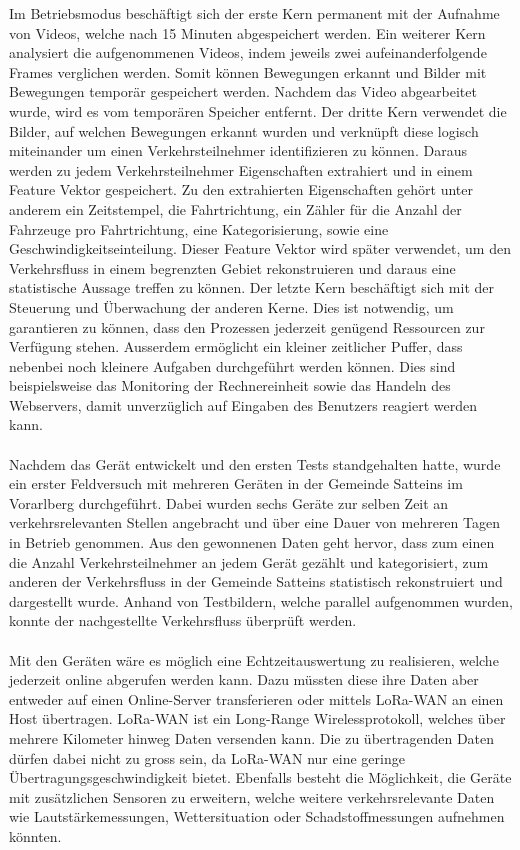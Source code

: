 Im Betriebsmodus beschäftigt sich der erste Kern permanent mit der Aufnahme von Videos, welche nach 15 Minuten abgespeichert werden. Ein weiterer Kern analysiert die aufgenommenen Videos, indem jeweils zwei aufeinanderfolgende Frames verglichen werden. Somit können Bewegungen erkannt und Bilder mit Bewegungen temporär gespeichert werden. Nachdem das Video abgearbeitet wurde, wird es vom temporären Speicher entfernt. Der dritte Kern verwendet die Bilder, auf welchen Bewegungen erkannt wurden und verknüpft diese logisch miteinander um einen Verkehrsteilnehmer identifizieren zu können. Daraus werden zu jedem Verkehrsteilnehmer Eigenschaften extrahiert und in einem Feature Vektor gespeichert. Zu den extrahierten Eigenschaften gehört unter anderem ein Zeitstempel, die Fahrtrichtung, ein Zähler für die Anzahl der Fahrzeuge pro Fahrtrichtung, eine Kategorisierung, sowie eine Geschwindigkeitseinteilung. Dieser Feature Vektor wird später verwendet, um den Verkehrsfluss in einem begrenzten Gebiet rekonstruieren und daraus eine statistische Aussage treffen zu können. Der letzte Kern beschäftigt sich mit der Steuerung und Überwachung der anderen Kerne. Dies ist notwendig, um garantieren zu können, dass den Prozessen jederzeit genügend Ressourcen zur Verfügung stehen. Ausserdem ermöglicht ein kleiner zeitlicher Puffer, dass nebenbei noch kleinere Aufgaben durchgeführt werden können. Dies sind beispielsweise das Monitoring der Rechnereinheit sowie das Handeln des Webservers, damit unverzüglich auf Eingaben des Benutzers reagiert werden kann.\\\\
Nachdem das Gerät entwickelt und den ersten Tests standgehalten hatte, wurde ein erster Feldversuch mit mehreren Geräten in der Gemeinde Satteins im Vorarlberg durchgeführt. Dabei wurden sechs Geräte zur selben Zeit an verkehrsrelevanten Stellen angebracht und über eine Dauer von mehreren Tagen in Betrieb genommen. Aus den gewonnenen Daten geht hervor, dass zum einen die Anzahl Verkehrsteilnehmer an jedem Gerät gezählt und kategorisiert, zum anderen der Verkehrsfluss in der Gemeinde Satteins statistisch rekonstruiert und dargestellt wurde. Anhand von Testbildern, welche parallel aufgenommen wurden, konnte der nachgestellte Verkehrsfluss überprüft werden.\\\\

\newpage
Mit den Geräten wäre es möglich eine Echtzeitauswertung zu realisieren, welche jederzeit online abgerufen werden kann. Dazu müssten diese ihre Daten aber entweder auf einen Online-Server transferieren oder mittels LoRa-WAN an einen Host übertragen. LoRa-WAN ist ein Long-Range Wirelessprotokoll, welches über mehrere Kilometer hinweg Daten versenden kann. Die zu übertragenden Daten dürfen dabei nicht zu gross sein, da LoRa-WAN nur eine geringe Übertragungsgeschwindigkeit bietet. Ebenfalls besteht die Möglichkeit, die Geräte mit zusätzlichen Sensoren zu erweitern, welche weitere verkehrsrelevante Daten wie Lautstärkemessungen, Wettersituation oder Schadstoffmessungen aufnehmen könnten.
\newpage